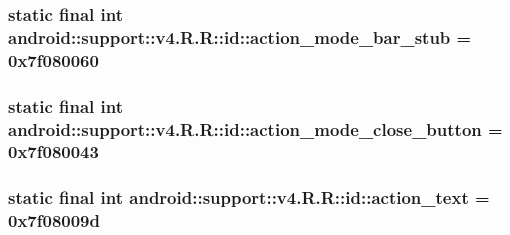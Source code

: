 \hypertarget{classandroid_1_1support_1_1v4_1_1_r_1_1id_d69d69a2fac3d9b133dd78e7744f05b7}{
\subsubsection[{action\_\-mode\_\-bar\_\-stub}]{\setlength{\rightskip}{0pt plus 5cm}static final int android::support::v4.R.R::id::action\_\-mode\_\-bar\_\-stub = 0x7f080060}}
\label{classandroid_1_1support_1_1v4_1_1_r_1_1id_d69d69a2fac3d9b133dd78e7744f05b7}


\hypertarget{classandroid_1_1support_1_1v4_1_1_r_1_1id_8d78396a16e429bdb3734ff6ca62bd88}{
\subsubsection[{action\_\-mode\_\-close\_\-button}]{\setlength{\rightskip}{0pt plus 5cm}static final int android::support::v4.R.R::id::action\_\-mode\_\-close\_\-button = 0x7f080043}}
\label{classandroid_1_1support_1_1v4_1_1_r_1_1id_8d78396a16e429bdb3734ff6ca62bd88}


\hypertarget{classandroid_1_1support_1_1v4_1_1_r_1_1id_76fa83f1383b563f8cb56bc3ac334147}{
\subsubsection[{action\_\-text}]{\setlength{\rightskip}{0pt plus 5cm}static final int android::support::v4.R.R::id::action\_\-text = 0x7f08009d}}
\label{classandroid_1_1support_1_1v4_1_1_r_1_1id_76fa83f1383b563f8cb56bc3ac334147}



